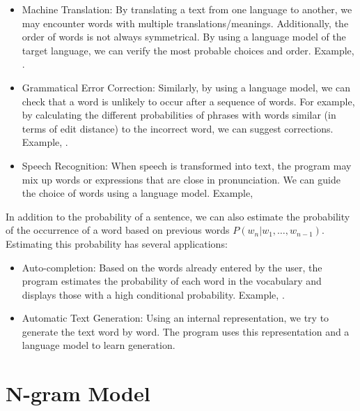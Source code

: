 \documentclass{KBook}
\begin{document}
\begin{itemize}
	\item Machine Translation: By translating a text from one language to another, we may encounter words with multiple translations/meanings. Additionally, the order of words is not always symmetrical. By using a language model of the target language, we can verify the most probable choices and order. Example, .
	
	\item Grammatical Error Correction: Similarly, by using a language model, we can check that a word is unlikely to occur after a sequence of words. For example, by calculating the different probabilities of phrases with words similar (in terms of edit distance) to the incorrect word, we can suggest corrections. Example, .
	
	\item Speech Recognition: When speech is transformed into text, the program may mix up words or expressions that are close in pronunciation. We can guide the choice of words using a language model. Example, 
\end{itemize}

In addition to the probability of a sentence, we can also estimate the probability of the occurrence of a word based on previous words $P(w_n | w_1, \ldots, w_{n-1})$. Estimating this probability has several applications:

\begin{itemize}
	\item Auto-completion: Based on the words already entered by the user, the program estimates the probability of each word in the vocabulary and displays those with a high conditional probability. Example, .
	
	\item Automatic Text Generation: Using an internal representation, we try to generate the text word by word. The program uses this representation and a language model to learn generation.
\end{itemize}


\section{N-gram Model}
\end{document}
